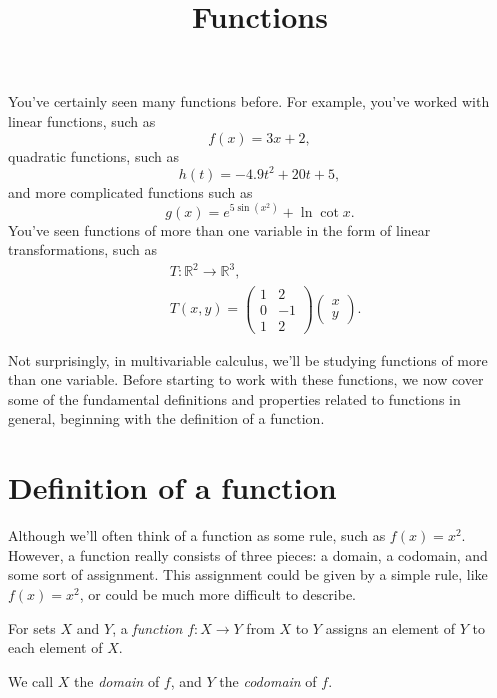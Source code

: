 \documentclass{ximera}
\title{Functions}
\begin{document}
\begin{abstract}
\end{abstract}
\maketitle

You've certainly seen many functions before. For example, you've worked with linear functions, such as
\[
f(x) = 3x+2,
\]
quadratic functions, such as
\[
h(t) = -4.9t^2 + 20t + 5,
\]
and more complicated functions such as
\[
g(x) = e^{5\sin(x^2)}+\ln \cot x.
\]
You've seen functions of more than one variable in the form of linear transformations, such as
\begin{align*}
&T:\mathbb{R}^2\rightarrow\mathbb{R}^3,\\
&T(x,y) = \left(\begin{array}{cc}
1 & 2\\
0 & -1\\
1 & 2
\end{array}\right)
\left(\begin{array}{c}
x\\
y
\end{array}\right).
\end{align*}

Not surprisingly, in multivariable calculus, we'll be studying functions of more than one variable. Before starting to work with these functions, we now cover some of the fundamental definitions and properties related to functions in general, beginning with the definition of a function.

\section*{Definition of a function}

Although we'll often think of a function as some rule, such as $f(x) = x^2$. However, a function really consists of three pieces: a domain, a codomain, and some sort of assignment. This assignment could be given by a simple rule, like $f(x) = x^2$, or could be much more difficult to describe.

\begin{definition}
For sets $X$ and $Y$, a \emph{function} $f:X\rightarrow Y$ from $X$ to $Y$ assigns an element of $Y$ to each element of $X$.

We call $X$ the \emph{domain} of $f$, and $Y$ the \emph{codomain} of $f$.
\end{definition}
\end{document}
